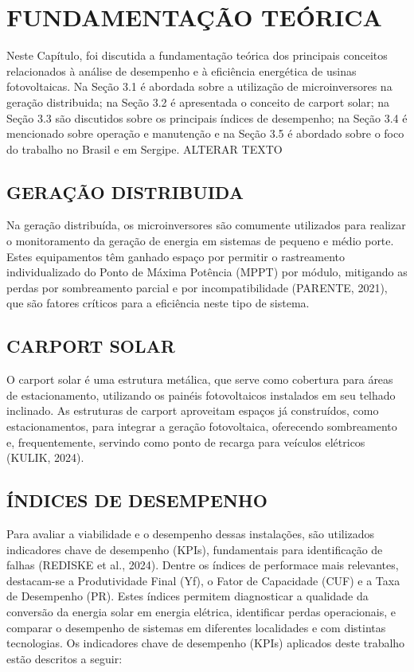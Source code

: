\renewcommand{\chaptername}{} %
\chapter{FUNDAMENTAÇÃO TEÓRICA}  %

Neste Capítulo, foi discutida a fundamentação teórica dos principais conceitos relacionados à análise de desempenho e à eficiência energética de usinas fotovoltaicas. Na Seção 3.1 é abordada sobre a utilização de microinversores na geração distribuida; na Seção 3.2 é apresentada o conceito de carport solar; na Seção 3.3 são discutidos sobre os principais índices de desempenho; na Seção 3.4 é mencionado sobre operação e manutenção e na Seção 3.5 é abordado sobre o foco do trabalho no Brasil e em Sergipe. ALTERAR TEXTO
\section{GERAÇÃO DISTRIBUIDA}

Na geração distribuída, os microinversores são comumente utilizados para realizar o monitoramento da geração de energia em sistemas de pequeno e médio porte. Estes equipamentos têm ganhado espaço por permitir o rastreamento individualizado do Ponto de Máxima Potência (MPPT) por módulo, mitigando as perdas por sombreamento parcial e por incompatibilidade (PARENTE, 2021), que são fatores críticos para a eficiência neste tipo de sistema.

\section{CARPORT SOLAR}

O carport solar é uma estrutura metálica, que serve como cobertura para áreas de estacionamento, utilizando os painéis fotovoltaicos instalados em seu telhado inclinado. As estruturas de carport aproveitam espaços já construídos, como estacionamentos, para integrar a geração fotovoltaica, oferecendo sombreamento e, frequentemente, servindo como ponto de recarga para veículos elétricos (KULIK, 2024).
\section{ÍNDICES DE DESEMPENHO}

Para avaliar a viabilidade e o desempenho dessas instalações, são utilizados indicadores chave de desempenho (KPIs), fundamentais para identificação de falhas (REDISKE et al., 2024). Dentre os índices  de performace mais relevantes, destacam-se a Produtividade Final (Yf), o Fator de Capacidade (CUF) e a Taxa de Desempenho (PR). Estes índices permitem diagnosticar a qualidade da conversão da energia solar em energia elétrica, identificar perdas operacionais, e comparar o desempenho de sistemas em diferentes localidades e com distintas tecnologias.
Os indicadores chave de desempenho (KPIs) aplicados deste trabalho estão descritos a seguir:
\newpage


